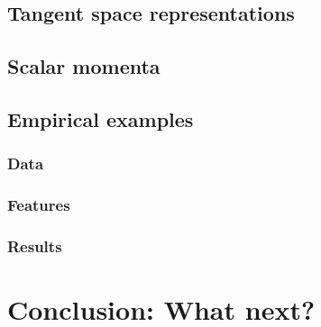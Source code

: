 \documentclass{beamer}
\begin{document}
    \subsection{Tangent space representations}
    \subsection{Scalar momenta}
    \subsection{Empirical examples}
        \subsubsection{Data}                     
        \subsubsection{Features}                 
        \subsubsection{Results}                  


\section{Conclusion: What next?}
\end{document}
